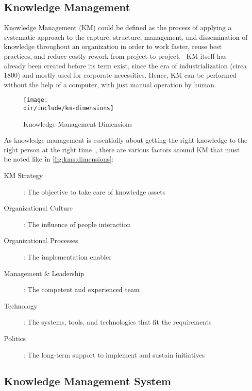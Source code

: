\subsection{Knowledge Management}

Knowledge Management  (\ac{KM}) could be defined as the process of applying a systematic approach to the capture, structure, management, and dissemination of knowledge throughout an organization in order to work faster, reuse best practices, and reduce costly rework from project to project.~\autocite{Dalkir2005KM}
\ac{KM} itself has already been created before its term exist, since the era of industrialization (circa 1800) and mostly used for corporate necessities.
Hence, \ac{KM} can be performed without the help of a computer, with just manual operation by human.

\begin{figure}[htbp]
    \centering
    \texttt{[image: \\dir/include/km-dimensions]}
    \caption{Knowledge Management Dimensions}
    \label{fig:kms:dimensions}
\end{figure}

As knowledge management is essentially about getting the right knowledge to the right person at the right time~\autocite{Frost2010KM}, there are various factors around \ac{KM} that must be noted like in \autoref{fig:kms:dimensions}:

\begin{description}
  \item [KM Strategy]: The objective to take care of knowledge assets
  \item [Organizational Culture]: The influence of people interaction
  \item [Organizational Processes]: The implementation enabler
  \item [Management \& Leadership]: The competent and experienced team
  \item [Technology]: The systems, tools, and technologies that fit the requirements
  \item [Politics]: The long-term support to implement and sustain initiatives
\end{description}

\subsection{Knowledge Management System}

